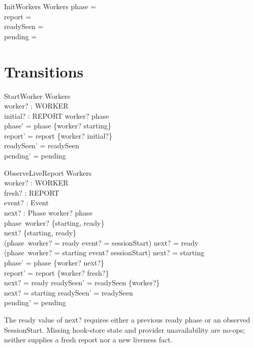 \documentclass[a4paper,10pt,fleqn]{article}
\begin{document}
\begin{schema}{InitWorkers}
  Workers
\where
  phase = \emptyset \\
  report = \emptyset \\
  readySeen = \emptyset \\
  pending = \emptyset
\end{schema}

\section{Transitions}

\begin{schema}{StartWorker}
  \Delta Workers \\
  worker? : WORKER \\
  initial? : REPORT
\where
  worker? \notin \dom phase \\
  phase' = phase \cup \{worker? \mapsto starting\} \\
  report' = report \cup \{worker? \mapsto initial?\} \\
  readySeen' = readySeen \\
  pending' = pending
\end{schema}

\begin{schema}{ObserveLiveReport}
  \Delta Workers \\
  worker? : WORKER \\
  fresh? : REPORT \\
  event? : Event \\
  next? : Phase
\where
  worker? \in \dom phase \\
  phase~worker? \in \{starting, ready\} \\
  next? \in \{starting, ready\} \\
  (phase~worker? = ready \lor event? = sessionStart) \implies next? = ready \\
  (phase~worker? = starting \land event? \neq sessionStart) \implies next? = starting \\
  phase' = phase \oplus \{worker? \mapsto next?\} \\
  report' = report \oplus \{worker? \mapsto fresh?\} \\
  next? = ready \implies readySeen' = readySeen \cup \{worker?\} \\
  next? = starting \implies readySeen' = readySeen \\
  pending' = pending
\end{schema}

The ready value of next? requires either a previous ready phase or an observed
SessionStart. Missing hook-store state and provider unavailability are no-ops;
neither supplies a fresh report nor a new liveness fact.
\end{document}
